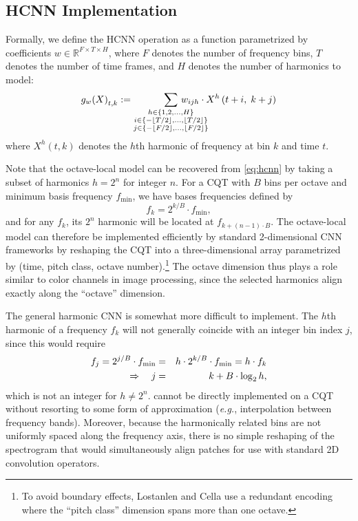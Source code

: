 \documentclass{article}
\def\eg{\emph{e.g.}}
\begin{document}
\subsection{HCNN Implementation}

Formally, we define the HCNN operation as a function parametrized by coefficients $w \in \mathbb{R}^{F \times T \times H}$, where $F$ denotes the number of frequency bins, $T$ denotes the number of time frames, and $H$ denotes the number of harmonics to model:
\begin{equation}
    {g_w(X)}_{t, k} := 
    \sum_{\substack{%
        h \in \{1, 2, \ldots, H\}\\
        i \in \{-\lfloor T/2\rfloor, \ldots, \lfloor T/2 \rfloor\}\\
        j \in \{-\lfloor F/2\rfloor, \ldots, \lfloor F/2 \rfloor\}}
    }
    \hspace{-3em}%
    w_{ijh} \cdot X^h\left(t + i,\; k + j\right)\label{eq:hcnn}
\end{equation}
where $X^h(t, k)$ denotes the $h$th harmonic of frequency at bin $k$ and time $t$.

Note that the octave-local model can be recovered from \cref{eq:hcnn} by taking a subset of harmonics $h=2^n$ for integer $n$.
For a CQT with $B$ bins per octave and minimum basis frequency $f_{\min}$, we have bases frequencies defined by
\begin{equation}
    f_k = 2^{k/B} \cdot f_{\min}, \label{eq:cqtfreqs}
\end{equation}
and for any $f_k$, its $2^n$ harmonic will be located at $f_{k + (n-1)\cdot B}$.
The octave-local model can therefore be implemented efficiently by standard 2-dimensional CNN frameworks by reshaping the CQT into a three-dimensional array parametrized by (time, pitch class, octave number).\footnote{To avoid boundary effects, Lostanlen and Cella use a redundant encoding where the ``pitch class'' dimension spans more than one octave.}
The octave dimension thus plays a role similar to color channels in image processing, since the selected harmonics align exactly along the ``octave'' dimension.

The general harmonic CNN is somewhat more difficult to implement.
The $h$th harmonic of a frequency $f_k$ will not generally coincide with an integer bin index $j$, since this would require
\begin{eqnarray}
    f_j = 2^{j/B} \cdot f_{\min} &=& h \cdot 2^{k/B}\cdot f_{\min} = h \cdot f_k \notag \\
\Rightarrow \quad j &=& k + B \cdot \log_2 h,
\end{eqnarray}
which is not an integer for $h \neq 2^n$.
 cannot be directly implemented on a CQT without resorting to some form of approximation (\eg, interpolation between frequency bands).
Moreover, because the harmonically related bins are not uniformly spaced along the frequency axis, there is no simple reshaping of the spectrogram that would simultaneously align patches for use with standard 2D convolution operators.
\end{document}
